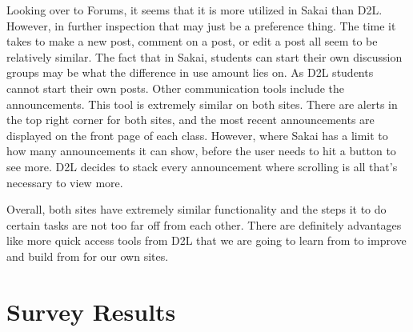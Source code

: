\documentclass[12pt]{article}
\begin{document}
    Looking over to Forums, it seems that it is more utilized in Sakai than D2L. However, in further inspection that may just be a preference thing.
    The time it takes to make a new post, comment on a post, or edit a post all seem to be relatively similar.
    The fact that in Sakai, students can start their own discussion groups may be what the difference in use amount lies on.
    As D2L students cannot start their own posts.
    Other communication tools include the announcements.
    This tool is extremely similar on both sites.
    There are alerts in the top right corner for both sites, and the most recent announcements are displayed on the front page of each class.
    However, where Sakai has a limit to how many announcements it can show, before the user needs to hit a button to see more.
    D2L decides to stack every announcement where scrolling is all that’s necessary to view more.

    Overall, both sites have extremely similar functionality and the steps it to do certain tasks are not too far off from each other.
    There are definitely advantages like more quick access tools from D2L that we are going to learn from to improve and build from for our own sites.


    \section{Survey Results}\label{sec:survey-results}
\end{document}
